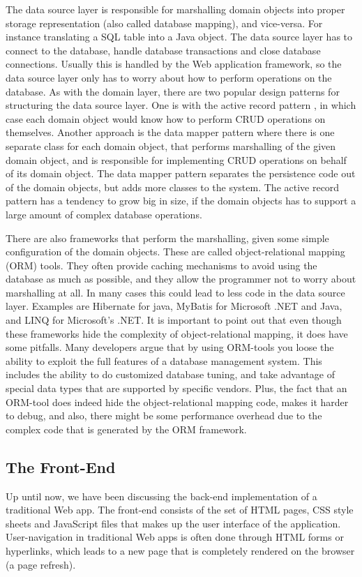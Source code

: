 The data source layer is responsible for marshalling domain objects into proper storage representation (also called database mapping), and vice-versa. For instance translating a SQL table into a Java object. The data source layer has to connect to the database, handle database transactions and close database connections. Usually this is handled by the Web application framework, so the data source layer only has to worry about how to perform operations on the database. As with the domain layer, there are two popular design patterns for structuring the data source layer. One is with the active record pattern \cite{poea}, in which case each domain object would know how to perform CRUD operations on themselves. Another approach is the data mapper pattern \cite{poea} where there is one separate class for each domain object, that performs marshalling of the given domain object, and is responsible for implementing CRUD operations on behalf of its domain object. The data mapper pattern separates the persistence code out of the domain objects, but adds more classes to the system. The active record pattern has a tendency to grow big in size, if the domain objects has to support a large amount of complex database operations. 
	
There are also frameworks that perform the marshalling, given some simple configuration of the domain objects. These are called object-relational mapping (ORM) tools. They often provide caching mechanisms to avoid using the database as much as possible, and they allow the programmer not to worry about marshalling at all. In many cases this could lead to less code in the data source layer. \cite{tedorm} Examples are Hibernate \cite{hibernate} for java, MyBatis\cite{mybatis} for Microsoft .NET and Java, and LINQ \cite{linq} for Microsoft's .NET. It is important to point out that even though these frameworks hide the complexity of object-relational mapping, it does have some pitfalls. Many developers argue that by using ORM-tools you loose the ability to exploit the full features of a database management system\cite[p. ~124]{ormlame}. This includes the ability to do customized database tuning, and take advantage of special data types that are supported by specific vendors. Plus, the fact that an ORM-tool does indeed hide the object-relational mapping code, makes it harder to debug, and also, there might be some performance overhead due to the complex code that is generated by the ORM framework.	
	
\subsection{The Front-End}
Up until now, we have been discussing the back-end implementation of a traditional Web app. The front-end consists of the set of HTML pages, CSS style sheets and JavaScript files that makes up the user interface of the application. User-navigation in traditional Web apps is often done through HTML forms or hyperlinks, which leads to a new page that is completely rendered on the browser (a page refresh). 

